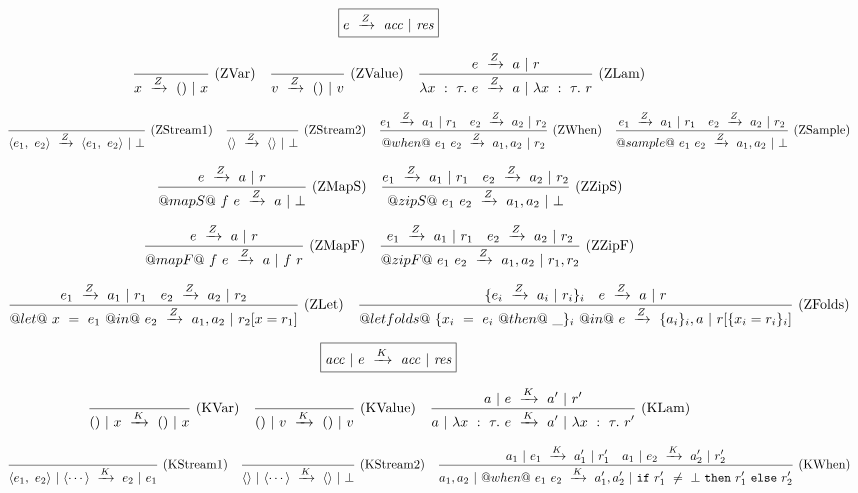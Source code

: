 
\begin{figure*}

$$
\boxed{\SourceStepZ{e}{\mi{acc}}{\mi{res}}}
$$

$$
\ruleAx
{
    \SourceStepZ{x}{()}{x}
}{ZVar}
\ruleAx
{
    \SourceStepZ{v}{()}{v}
}{ZValue}
\ruleIN
{
    \SourceStepZ{e}{a}{r}
}
{
    \SourceStepZ{\lambda{}x~:~\tau.~e}{a}{\lambda{}x~:~\tau.~r}
}{ZLam}
$$

$$
\ruleAx
{
    \SourceStepZ{\langle e_1,~e_2 \rangle}{\langle e_1,~e_2 \rangle}{\bot}
}{ZStream1}
\ruleAx
{
    \SourceStepZ{\langle \rangle}{\langle \rangle}{\bot}
}{ZStream2}
\ruleIN
{
    \SourceStepZ{e_1}{a_1}{r_1}
    \quad
    \SourceStepZ{e_2}{a_2}{r_2}
}
{
    \SourceStepZ{@when@~e_1~e_2}{a_1,a_2}{r_2}
}{ZWhen}
\ruleIN
{
    \SourceStepZ{e_1}{a_1}{r_1}
    \quad
    \SourceStepZ{e_2}{a_2}{r_2}
}
{
    \SourceStepZ{@sample@~e_1~e_2}{a_1,a_2}{\bot}
}{ZSample}
$$

$$
\ruleIN
{
    \SourceStepZ{e}{a}{r}
}
{
    \SourceStepZ{@mapS@~f~e}{a}{\bot}
}{ZMapS}
\ruleIN
{
    \SourceStepZ{e_1}{a_1}{r_1}
    \quad
    \SourceStepZ{e_2}{a_2}{r_2}
}
{
    \SourceStepZ{@zipS@~e_1~e_2}{a_1,a_2}{\bot}
}{ZZipS}
$$

$$
\ruleIN
{
    \SourceStepZ{e}{a}{r}
}
{
    \SourceStepZ{@mapF@~f~e}{a}{f~r}
}{ZMapF}
\ruleIN
{
    \SourceStepZ{e_1}{a_1}{r_1}
    \quad
    \SourceStepZ{e_2}{a_2}{r_2}
}
{
    \SourceStepZ{@zipF@~e_1~e_2}{a_1,a_2}{r_1,r_2}
}{ZZipF}
$$

$$
\ruleIN
{
    \SourceStepZ{e_1}{a_1}{r_1}
    \quad
    \SourceStepZ{e_2}{a_2}{r_2}
}
{
    \SourceStepZ{@let@~x~=~e_1~@in@~e_2}{a_1,a_2}{r_2[x=r_1]}
}{ZLet}
\ruleIN
{
    \{ \SourceStepZ{e_i}{a_i}{r_i} \}_i
    \quad
    \SourceStepZ{e}{a}{r}
}
{
    \SourceStepZ{@let folds@~\{x_i~=~e_i~@then@~\_\}_i~@in@~e}{\{a_i\}_i,a}{r[\{x_i=r_i\}_i]}
}{ZFolds}
$$

$$
\boxed{\SourceStepK{\mi{acc}}{e}{\mi{acc}}{\mi{res}}}
$$


$$
\ruleAx
{
    \SourceStepK{()}{x}{()}{x}
}{KVar}
\ruleAx
{
    \SourceStepK{()}{v}{()}{v}
}{KValue}
\ruleIN
{
    \SourceStepK{a}{e}{a'}{r'}
}
{
    \SourceStepK{a}{\lambda{}x~:~\tau.~e}{a'}{\lambda{}x~:~\tau.~r'}
}{KLam}
$$

$$
\ruleAx
{
    \SourceStepK{\langle e_1,~e_2 \rangle}{\langle \cdots \rangle}{e_2}{e_1}
}{KStream1}
\ruleAx
{
    \SourceStepK{\langle \rangle}{\langle \cdots \rangle}{\langle\rangle}{\bot}
}{KStream2}
\ruleIN
{
    \SourceStepK{a_1}{e_1}{a_1'}{r_1'}
    \quad
    \SourceStepK{a_1}{e_2}{a_2'}{r_2'}
}
{
    \SourceStepK{a_1,a_2}{@when@~e_1~e_2}{a_1',a_2'}{\Ifnbot{r_1'}{r_1'}{r_2'}}
}{KWhen}
$$


\end{figure*}
